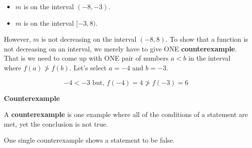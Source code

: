 \documentclass{ximera}
\begin{document}
\begin{example}
\begin{itemize}
\item $m$ is  on the interval $(-8,-3)$.  
\item $m$ is  on the interval $[-3, 8)$. 
\end{itemize}



However, $m$ is not decreasing on the interval $(-8, 8)$.  To show that a function is not decreasing on an interval, we merely have to give ONE \textbf{counterexample}. That is we need to come up with ONE pair of numbers $a < b$ in the interval where $f(a) \ngtr f(b)$.  Let's select $a = -4$ and $b = -3$.

\[ -4 < -3    \text{ but, }   f(-4) = 4  \ngtr f(-3) = 6 \]




\end{example}












\begin{idea} \textbf{\textcolor{blue!55!black}{Counterexample}} 

A \textbf{counterexample} is one example where all of the conditions of a statement are met, yet the conclusion is not true.  

One single counterexample shows a statement to be false.


\end{idea}
\end{document}
